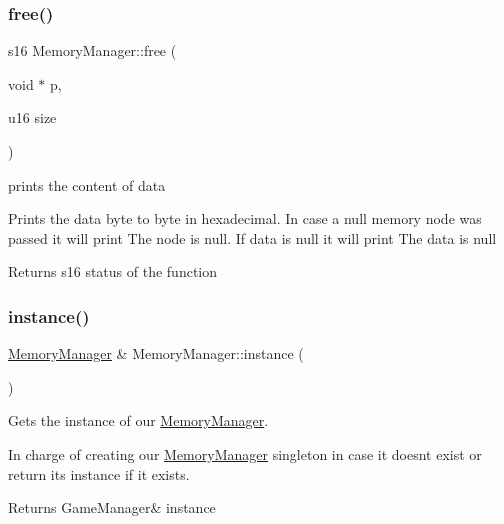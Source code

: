 \subsubsection{\texorpdfstring{free()}{free()}}
{\footnotesize\ttfamily s16 Memory\+Manager\+::free (\begin{DoxyParamCaption}\item[{void $\ast$}]{p,  }\item[{u16}]{size }\end{DoxyParamCaption})}



prints the content of data 

Prints the data byte to byte in hexadecimal. In case a null memory node was passed it will print The node is null. If data is null it will print The data is null \begin{DoxyReturn}{Returns}
s16 status of the function 
\end{DoxyReturn}
\mbox{\label{class_memory_manager_aca47d9c82aaf9978968a3e6ac9216e79}} 
\subsubsection{\texorpdfstring{instance()}{instance()}}
{\footnotesize\ttfamily \hyperlink{class_memory_manager}{Memory\+Manager} \& Memory\+Manager\+::instance (\begin{DoxyParamCaption}{ }\end{DoxyParamCaption})\hspace{0.3cm}{\ttfamily [static]}}



Gets the instance of our \hyperlink{class_memory_manager}{Memory\+Manager}. 

In charge of creating our \hyperlink{class_memory_manager}{Memory\+Manager} singleton in case it doesn\textquotesingle{}t exist or return it\textquotesingle{}s instance if it exists.

\begin{DoxyReturn}{Returns}
Game\+Manager\& instance 
\end{DoxyReturn}
\mbox{\label{class_memory_manager_abad4b4e43287ee7446b80090abe339df}} 
